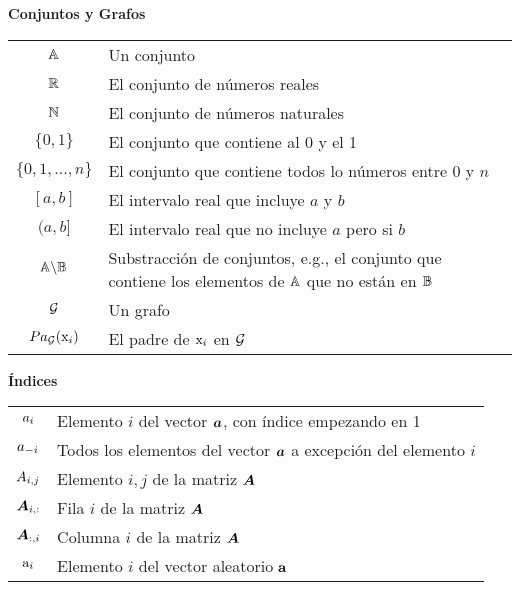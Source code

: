 \vspace{\notationgap}
\begin{minipage}{\textwidth}
\centerline{\bf Conjuntos y Grafos}
\bgroup
\def\arraystretch{1.5}
\begin{tabular}{cp{}}
$\displaystyle {\mathbb{A}}$ & Un conjunto\\
$\displaystyle \mathbb{R}$ & El conjunto de números reales \\
$\displaystyle \mathbb{N}$ & El conjunto de números naturales \\
$\displaystyle \{0, 1\}$ & El conjunto que contiene al 0 y el 1 \\
$\displaystyle \{0, 1, \dots, n \}$ & El conjunto que contiene todos lo números entre $0$ y $n$\\
$\displaystyle [a, b]$ & El intervalo real que incluye $a$ y $b$\\
$\displaystyle (a, b]$ & El intervalo real que no incluye $a$ pero si $b$ \\
$\displaystyle {\mathbb{A}} \backslash {\mathbb{B}}$ & Substracción de conjuntos, e.g., el conjunto que contiene los elementos de  ${\mathbb{A}}$ que no están en ${\mathbb{B}}$\\
$\displaystyle {\mathcal{G}}$ & Un grafo\\
$\displaystyle Pa_{\mathcal{G}}({\textnormal{x}}_i)$ & El padre de ${\textnormal{x}}_i$ en ${\mathcal{G}}$
\end{tabular}
\egroup
{}
\end{minipage}

\vspace{\notationgap}
\begin{minipage}{\textwidth}
\centerline{\bf Índices}
\bgroup
\def\arraystretch{1.5}
\begin{tabular}{cp{}}
$\displaystyle {a}_i$ & Elemento $i$ del vector ${\bm{a}}$, con índice empezando en 1\\
$\displaystyle {a}_{-i}$ & Todos los elementos del vector ${\bm{a}}$ a excepción del elemento $i$ \\
$\displaystyle {A}_{i,j}$ & Elemento $i, j$ de la matriz ${\bm{A}}$ \\
$\displaystyle {\bm{A}}_{i, :}$ & Fila $i$ de la matriz ${\bm{A}}$ \\
$\displaystyle {\bm{A}}_{:, i}$ & Columna $i$ de la matriz ${\bm{A}}$ \\
$\displaystyle {\textnormal{a}}_i$ & Elemento $i$ del vector aleatorio ${\mathbf{a}}$ \\
\end{tabular}
\egroup
\end{minipage}


